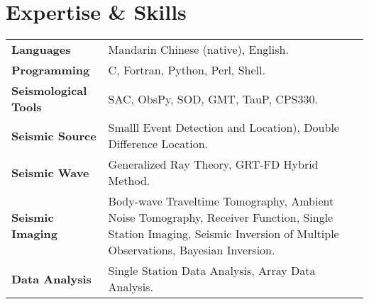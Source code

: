 \section*{Expertise \& Skills}

\begin{tabular}{p{} p{}}
\textbf{Languages} & Mandarin Chinese (native), English. \\
\textbf{Programming} & C, Fortran, Python, Perl, Shell. \\
\textbf{Seismological Tools} & SAC, ObsPy, SOD, GMT, TauP, CPS330. \\
\textbf{Seismic Source} & Smalll Event Detection and Location), Double Difference Location. \\
\textbf{Seismic Wave} & Generalized Ray Theory, GRT-FD Hybrid Method. \\
\textbf{Seismic Imaging} & Body-wave Traveltime Tomography, Ambient Noise Tomography, Receiver Function, Single Station Imaging, Seismic Inversion of Multiple Observations, Bayesian Inversion. \\
\textbf{Data Analysis} & Single Station Data Analysis, Array Data Analysis. \\
\end{tabular}
